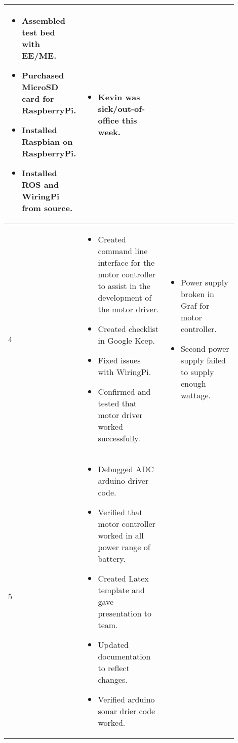 \documentclass[onecolumn, draftclsnofoot,10pt, compsoc]{IEEEtran}
\newenvironment{myitemize}
{ \begin{itemize}
    \setlength{\itemsep}{0pt}
    \setlength{\parskip}{0pt}
    \setlength{\parsep}{0pt}     }
{ \end{itemize}                  }
\begin{document}
\begin{singlespacing}
\begin{tabular} {l p{0.45\linewidth} p{0.45\linewidth}}
\begin{myitemize}
\item Assembled test bed with EE/ME.
\item Purchased MicroSD card for RaspberryPi.
\item Installed Raspbian on RaspberryPi.
\item Installed ROS and WiringPi from source.
\vspace{-\baselineskip}\end{myitemize} & 
\vspace{-\baselineskip}\begin{myitemize}
\item Kevin was sick/out-of-office this week.
\vspace{-\baselineskip}\end{myitemize} \\\hline
4 & 
\vspace{-\baselineskip}\begin{myitemize}
\item Created command line interface for the motor controller to assist in the development of the motor driver.
\item Created checklist in Google Keep.
\item Fixed issues with WiringPi.
\item Confirmed and tested that motor driver worked successfully.
\vspace{-\baselineskip}\end{myitemize} & 
\vspace{-\baselineskip}\begin{myitemize}
\item Power supply broken in Graf for motor controller.
\item Second power supply failed to supply enough wattage.
\vspace{-\baselineskip}\end{myitemize} \\\hline
5 &
\vspace{-\baselineskip}\begin{myitemize}
\item Debugged ADC arduino driver code.
\item Verified that motor controller worked in all power range of battery.
\item Created Latex template and gave presentation to team.
\item Updated documentation to reflect changes.
\item Verified arduino sonar drier code worked.
\vspace{-\baselineskip}\end{myitemize} & 

\end{tabular}
\end{singlespacing}
\end{document}
